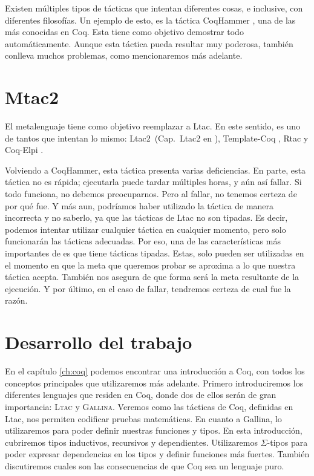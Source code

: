 Existen múltiples tipos de tácticas que intentan diferentes cosas, e inclusive, con diferentes filosofías.
Un ejemplo de esto, es la táctica CoqHammer \cite{DBLP:journals/jar/CzajkaK18}, una de las más conocidas en Coq. Esta tiene como objetivo demostrar todo automáticamente.
Aunque esta táctica pueda resultar muy poderosa, también conlleva muchos problemas, como mencionaremos más adelante.

\section{Mtac2}

El metalenguaje \Mtac \cite{DBLP:journals/pacmpl/KaiserZKRD18} tiene como objetivo reemplazar a Ltac.
En este sentido, es uno de tantos que intentan lo mismo: Ltac2~(Cap.~Ltac2 en \cite{manual de referencia 8.11}), Template-Coq \cite{DBLP:conf/itp/AnandBCST18}, Rtac \cite{DBLP:conf/esop/MalechaB16} y Coq-Elpi \cite{tassi:hal-01637063}.

Volviendo a CoqHammer, esta táctica presenta varias deficiencias.
En parte, esta táctica no es rápida; ejecutarla puede tardar múltiples horas, y aún así fallar.
Si todo funciona, no debemos preocuparnos.
Pero al fallar, no tenemos certeza de por qué fue.
Y más aun, podríamos haber utilizado la táctica de manera incorrecta y no saberlo, ya que las tácticas de Ltac no son tipadas.
Es decir, podemos intentar utilizar cualquier táctica en cualquier momento, pero solo funcionarán las tácticas adecuadas.
Por eso, una de las características más importantes de \mtac es que tiene tácticas tipadas.
Estas, solo pueden ser utilizadas en el momento en que la meta que queremos probar se aproxima a lo que nuestra táctica acepta.
También nos asegura de que forma será la meta resultante de la ejecución.
Y por último, en el caso de fallar, tendremos certeza de cual fue la razón.


\section{Desarrollo del trabajo}

En el capítulo \ref{ch:coq} podemos encontrar una introducción a Coq, con todos los conceptos principales que utilizaremos más adelante.
Primero introduciremos los diferentes lenguajes que residen en Coq, donde dos de ellos serán de gran importancia: \textsc{Ltac} y \textsc{Gallina}.
Veremos como las tácticas de Coq, definidas en Ltac, nos permiten codificar pruebas matemáticas.
En cuanto a Gallina, lo utilizaremos para poder definir nuestras funciones y tipos.
En esta introducción, cubriremos tipos inductivos, recursivos y dependientes.
Utilizaremos $\Sigma$-tipos para poder expresar dependencias en los tipos y definir funciones más fuertes.
También discutiremos cuales son las consecuencias de que Coq sea un lenguaje puro.

